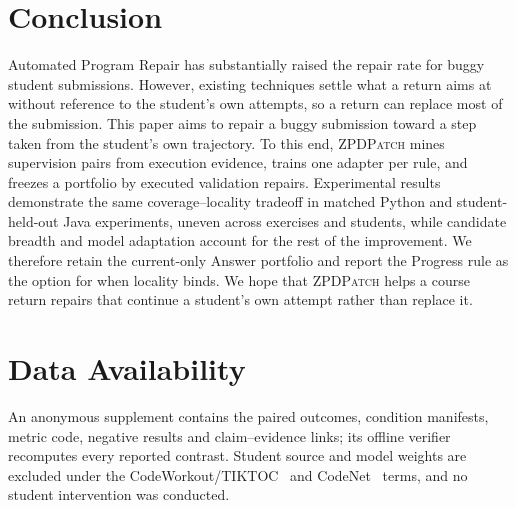 \documentclass[10pt,conference]{IEEEtran}
\begin{document}
\section{Conclusion}
\label{sec:conclusion}
Automated Program Repair has substantially raised the repair rate for buggy student submissions. However, existing techniques settle what a return aims at without reference to the student's own attempts, so a return can replace most of the submission. This paper aims to repair a buggy submission toward a step taken from the student's own trajectory. To this end, \textsc{ZPDPatch} mines supervision pairs from execution evidence, trains one adapter per rule, and freezes a portfolio by executed validation repairs. Experimental results demonstrate the same coverage--locality tradeoff in matched Python and student-held-out Java experiments, uneven across exercises and students, while candidate breadth and model adaptation account for the rest of the improvement. We therefore retain the current-only Answer portfolio and report the Progress rule as the option for when locality binds. We hope that \textsc{ZPDPatch} helps a course return repairs that continue a student's own attempt rather than replace it.

\section*{Data Availability}
An anonymous supplement contains the paired outcomes, condition manifests, metric code, negative results and claim--evidence links; its offline verifier recomputes every reported contrast. Student source and model weights are excluded under the CodeWorkout/TIKTOC~\cite{duan2025test} and CodeNet~\cite{puri2021codenet} terms, and no student intervention was conducted.


\clearpage
{}


\end{document}
